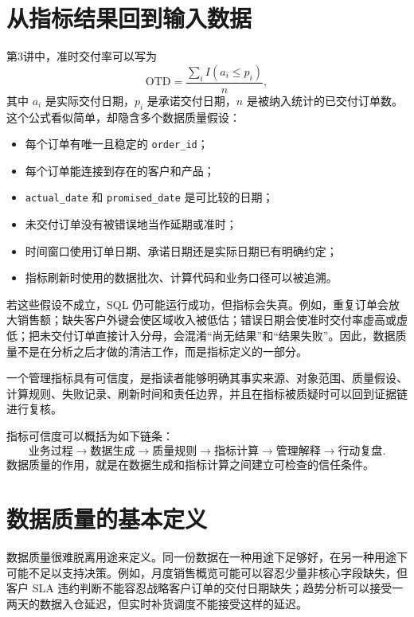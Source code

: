 \documentclass[UTF8,fontset=fandol,openany,zihao=-4]{ctexbook}
\begin{document}
\section{从指标结果回到输入数据}

第3讲中，准时交付率可以写为
\[
\mathrm{OTD}
=
\frac{\sum_i I(a_i\le p_i)}{n},
\]
其中 \(a_i\) 是实际交付日期，\(p_i\) 是承诺交付日期，\(n\) 是被纳入统计的已交付订单数。这个公式看似简单，却隐含多个数据质量假设：
\begin{itemize}
  \item 每个订单有唯一且稳定的 \texttt{order\_id}；
  \item 每个订单能连接到存在的客户和产品；
  \item \texttt{actual\_date} 和 \texttt{promised\_date} 是可比较的日期；
  \item 未交付订单没有被错误地当作延期或准时；
  \item 时间窗口使用订单日期、承诺日期还是实际日期已有明确约定；
  \item 指标刷新时使用的数据批次、计算代码和业务口径可以被追溯。
\end{itemize}

若这些假设不成立，SQL 仍可能运行成功，但指标会失真。例如，重复订单会放大销售额；缺失客户外键会使区域收入被低估；错误日期会使准时交付率虚高或虚低；把未交付订单直接计入分母，会混淆“尚无结果”和“结果失败”。因此，数据质量不是在分析之后才做的清洁工作，而是指标定义的一部分。

\begin{definition}[指标可信度]
一个管理指标具有可信度，是指读者能够明确其事实来源、对象范围、质量假设、计算规则、失败记录、刷新时间和责任边界，并且在指标被质疑时可以回到证据链进行复核。
\end{definition}

指标可信度可以概括为如下链条：
\[
\text{业务过程}
\rightarrow
\text{数据生成}
\rightarrow
\text{质量规则}
\rightarrow
\text{指标计算}
\rightarrow
\text{管理解释}
\rightarrow
\text{行动复盘}.
\]
数据质量的作用，就是在数据生成和指标计算之间建立可检查的信任条件。

\section{数据质量的基本定义}

数据质量很难脱离用途来定义。同一份数据在一种用途下足够好，在另一种用途下可能不足以支持决策。例如，月度销售概览可能可以容忍少量非核心字段缺失，但客户 SLA 违约判断不能容忍战略客户订单的交付日期缺失；趋势分析可以接受一两天的数据入仓延迟，但实时补货调度不能接受这样的延迟。
\end{document}
